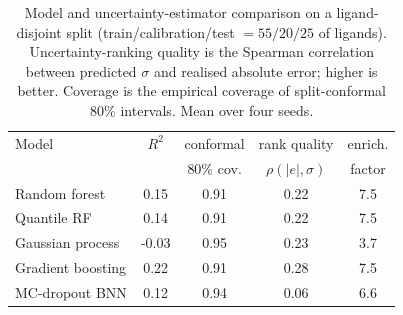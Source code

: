 \begin{table}[htbp]
\centering
\caption{Model and uncertainty-estimator comparison on a ligand-disjoint split (train/calibration/test $=55/20/25$ of ligands). Uncertainty-ranking quality is the Spearman correlation between predicted $\sigma$ and realised absolute error; higher is better. Coverage is the empirical coverage of split-conformal 80\% intervals. Mean over four seeds.}
\label{tab:uq}
\begin{tabular}{lcccc}
\toprule
Model & $R^2$ & conformal & rank quality & enrich. \\
 & & 80\% cov. & $\rho(|e|,\sigma)$ & factor \\
\midrule
Random forest & 0.15 & 0.91 & 0.22 & 7.5 \\
Quantile RF & 0.14 & 0.91 & 0.22 & 7.5 \\
Gaussian process & -0.03 & 0.95 & 0.23 & 3.7 \\
Gradient boosting & 0.22 & 0.91 & 0.28 & 7.5 \\
MC-dropout BNN & 0.12 & 0.94 & 0.06 & 6.6 \\
\bottomrule
\end{tabular}
\end{table}
